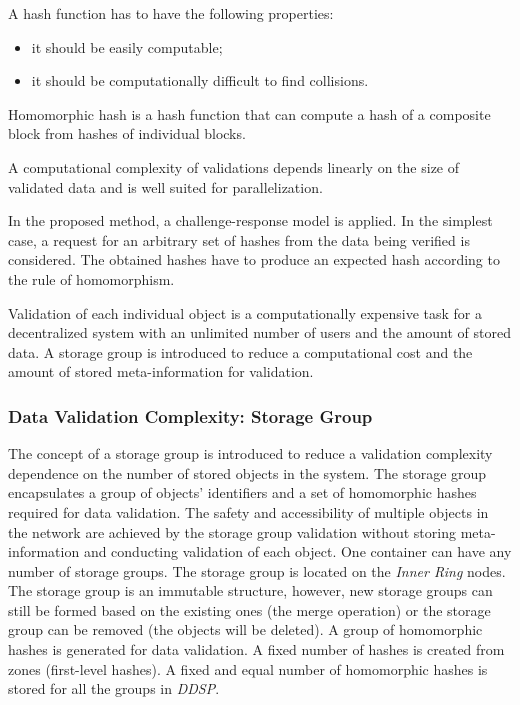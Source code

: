 \documentclass[a4paper, 11pt]{article}
\begin{document}
A hash function has to have the following properties:
\begin{itemize}
\item it should be easily computable;
\item it should be computationally difficult to find collisions.
\end{itemize}

Homomorphic hash is a hash function that can compute a hash of a
composite block from hashes of individual blocks. 

A computational complexity of validations depends linearly on the size of validated data and is well suited for parallelization. 

In the proposed method, a challenge-response model is applied. 
In the simplest case, a request for an arbitrary set of hashes from the data being verified is considered.
The obtained hashes  have to produce an expected hash according to the rule of homomorphism. 

Validation of each individual object is a computationally expensive task for a decentralized system with an unlimited number of users and the amount of stored data. A storage group is introduced to reduce a computational cost and the amount of stored meta-information for validation. 

\subsubsection{Data Validation Complexity: Storage Group}

The concept of a storage group is introduced to reduce a validation complexity dependence
on the number of stored objects in the system. The storage group encapsulates a group of objects’
identifiers and a set of homomorphic hashes required for data validation. The safety and accessibility
of multiple objects in the network are achieved by the storage group validation without storing meta-information and conducting validation of each object. 
One container can have any number of storage groups. The storage group is located on the \textit{Inner Ring} nodes.
The storage group is an immutable structure, however, new storage groups can still be formed based on the 
existing ones (the merge operation) or the storage group can be removed (the objects will be deleted).
A group of homomorphic hashes is generated for data validation. A fixed number of hashes is created
from zones (first-level hashes).
A fixed and equal number of homomorphic hashes is stored for all the groups in \textit{DDSP}. 
\end{document}
